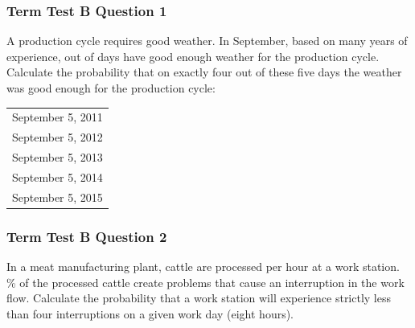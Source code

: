 \documentclass[xcolor=dvipsnames]{beamer}
\begin{document}



\begin{frame}
  \frametitle{Term Test B Question 1}
A production cycle requires good weather. In September,
based on many years of experience, {\puw} out of {\iex} days have good enough
weather for the production cycle. Calculate the probability that
on exactly four out of these five days the weather was good enough for
the production cycle:

\begin{tabular}{l}
  September 5, 2011 \\
  September 5, 2012 \\
  September 5, 2013 \\
  September 5, 2014 \\
  September 5, 2015 \\
\end{tabular}
\end{frame}

\begin{frame}
  \frametitle{Term Test B Question 2}
  In a meat manufacturing plant, {\nae} cattle are processed per
hour at a work station. {\mih}\% of the processed cattle create problems
that cause an interruption in the work flow. Calculate the probability
that a work station will experience strictly less than four
interruptions on a given work day (eight hours). 
\end{frame}
\end{document}
